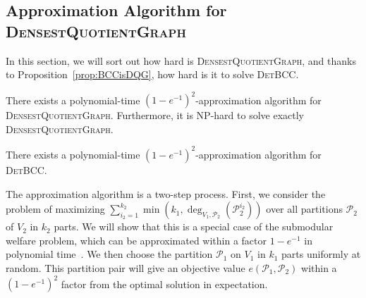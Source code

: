 \subsection{Approximation Algorithm for \textsc{DensestQuotientGraph}}
In this section, we will sort out how hard is \textsc{DensestQuotientGraph}, and thanks to Proposition~\ref{prop:BCCisDQG}, how hard is it to solve \textsc{DetBCC}.

\begin{theorem}
  \label{theo:DQGapprox}
  There exists a polynomial-time $(1-e^{-1})^2$-approximation algorithm for \textsc{DensestQuotientGraph}. Furthermore, it is \textrm{NP}-hard to solve exactly \textsc{DensestQuotientGraph}.
\end{theorem}

\begin{corollary}
  \label{theo:DetBCCapprox}
  There exists a polynomial-time $(1-e^{-1})^2$-approximation algorithm for \textsc{DetBCC}.
\end{corollary}

The approximation algorithm is a two-step process. First, we consider the problem of maximizing $\sum_{i_2=1}^{k_2}\min\left(k_1,\deg_{V_1,\mathcal{P}_2}(\mathcal{P}_2^{i_2})\right)$ over all partitions $\mathcal{P}_2$ of $V_2$ in $k_2$ parts. We will show that this is a special case of the submodular welfare problem, which can be approximated within a factor $1-e^{-1}$ in polynomial time~\cite{Vondrak08}. We then choose the partition $\mathcal{P}_1$ on $V_1$ in $k_1$ parts uniformly at random. This partition pair will give an objective value $e(\mathcal{P}_1,\mathcal{P}_2)$ within a $(1-e^{-1})^2$ factor from the optimal solution in expectation.

